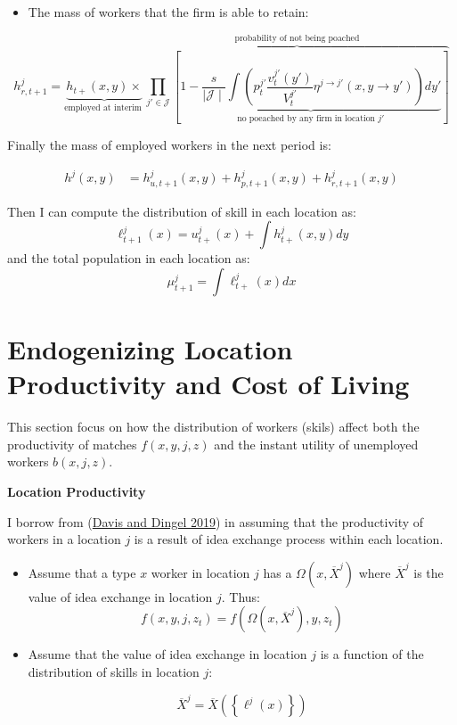 \documentclass[
  letterpaper,
  DIV=11,
  numbers=noendperiod]{scrreprt}
\providecommand{\tightlist}{%
  \setlength{\itemsep}{0pt}\setlength{\parskip}{0pt}}\usepackage{longtable,booktabs,array}
\begin{document}
\begin{itemize}
\tightlist
\item
  The mass of workers that the firm is able to retain:
\end{itemize}

\begin{equation}
h^j_{r,t+1} = \underbrace{h_{t+}(x,y)  \times }_{\text{employed at interim }} \overbrace{\prod_{j'\in\mathcal{J}}\left[ \underbrace{1 - \frac{s}{\mid \mathcal{J} \mid}\int\left( p^{j'}_t\frac{v^{j'}_t(y')}{V^{j'}_t} \eta^{j\to j'}(x,y\to y')\right)dy'}_{\text{no poeached by any firm in location }j'} \right]}^{\text{probability of not being poached}}
\end{equation}

Finally the mass of employed workers in the next period is:

\begin{align}
h^j(x,y) &=  h^j_{u, t+1}(x,y) + h^j_{p, t+1}(x,y) + h^j_{r,t+1}(x,y) 
\end{align}

Then I can compute the distribution of skill in each location as:
\[\ell^j_{t+1}(x) = u^j_{t+}(x) + \int h^j_{t+}(x,y)dy\] and the total
population in each location as: \[\mu^j_{t+1} = \int \ell^j_{t+}(x)dx\]


\hypertarget{endogenizing-location-productivity-and-cost-of-living}{%
\chapter{Endogenizing Location Productivity and Cost of
Living}\label{endogenizing-location-productivity-and-cost-of-living}}

This section focus on how the distribution of workers (skils) affect
both the productivity of matches \(f(x,y,j,z)\) and the instant utility
of unemployed workers \(b(x,j,z)\).

\textbf{Location Productivity}

I borrow from
(\protect\hyperlink{ref-davisSpatialKnowledgeEconomy2019}{Davis and
Dingel 2019}) in assuming that the productivity of workers in a location
\(j\) is a result of idea exchange process within each location.

\begin{itemize}
\item
  Assume that a type \(x\) worker in location \(j\) has a
  \(\Omega(x, \overline{X}^j)\) where \(\overline{X}^j\) is the value of
  idea exchange in location \(j\). Thus:
  \[f(x,y,j,z_t) = f\left(\Omega(x, \overline{X}^j), y, z_t\right)\]
\item
  Assume that the value of idea exchange in location \(j\) is a function
  of the distribution of skills in location \(j\):

  \[ \overline{X}^j = \overline{X}\left(\left\{\ell^j(x)\right\}\right) \]
\end{itemize}
\end{document}
